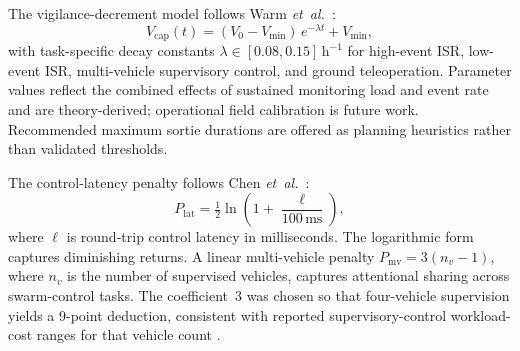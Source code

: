 \documentclass[10pt,journal,twocolumn,compsoc]{IEEEtran}
\begin{document}
The vigilance-decrement model follows Warm \textit{et~al.}~\cite{warm2008}:
\begin{equation}
V_{\mathrm{cap}}(t) = (V_0 - V_{\min})\, e^{-\lambda t} + V_{\min},
\label{eq:vig}
\end{equation}
with task-specific decay constants $\lambda \in [0.08, 0.15]\,\mathrm{h}^{-1}$ for high-event ISR, low-event ISR, multi-vehicle supervisory control, and ground teleoperation. Parameter values reflect the combined effects of sustained monitoring load and event rate and are theory-derived; operational field calibration is future work. Recommended maximum sortie durations are offered as planning heuristics rather than validated thresholds.

The control-latency penalty follows Chen \textit{et~al.}~\cite{chen2007}:
\begin{equation}
P_{\mathrm{lat}} = \tfrac{1}{2}\ln\!\left(1 + \frac{\ell}{100\,\mathrm{ms}}\right),
\label{eq:lat}
\end{equation}
where $\ell$ is round-trip control latency in milliseconds. The logarithmic form captures diminishing returns. A linear multi-vehicle penalty $P_{\mathrm{mv}} = 3(n_v - 1)$, where $n_v$ is the number of supervised vehicles, captures attentional sharing across swarm-control tasks. The coefficient~3 was chosen so that four-vehicle supervision yields a 9-point deduction, consistent with reported supervisory-control workload-cost ranges for that vehicle count \cite{donmez2010}.
\end{document}
